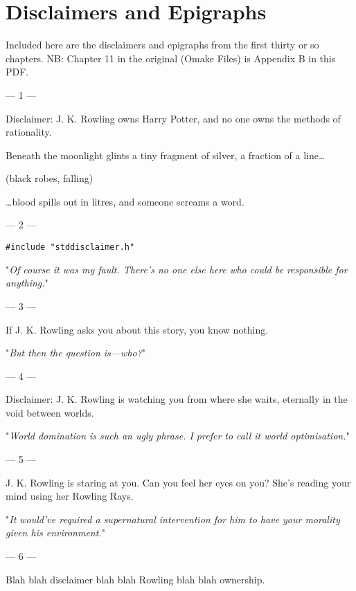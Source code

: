 \chapter{Disclaimers and Epigraphs}

Included here are the disclaimers and epigraphs from the first thirty or so
chapters. NB: Chapter 11 in the original (Omake Files) is Appendix B in this PDF.

\sbreak
{ %
\setlength{\parindent}{0pt}
\setlength{\parskip}{1em}

\filbreak
--- 1 ---

Disclaimer: J. K. Rowling owns Harry Potter, and no one owns the methods of rationality.

\begin{em}
Beneath the moonlight glints a tiny fragment of silver, a fraction of a line{\ldots}

(black robes, falling)

{\ldots}blood spills out in litres, and someone screams a word.
\end{em}

\filbreak
--- 2 ---

\texttt{\#include "stddisclaimer.h"}

"\emph{Of course it was my fault. There's no one else here who could be 
responsible for anything.}"

\filbreak
--- 3 ---

If J. K. Rowling asks you about this story, you know nothing.

"\emph{But then the question is---who?}"

\filbreak
--- 4 ---

Disclaimer: J. K.
Rowling is watching you from where she waits, eternally in the void between
worlds.

"\emph{World domination is such an ugly phrase. I prefer to call it world
optimisation.}"

\filbreak
--- 5 ---

J. K. Rowling is
staring at you. Can you feel her eyes on you? She's reading your mind using her
Rowling Rays.

"\emph{It would've required a \emph{supernatural intervention} for him to have
\emph{your} morality given \emph{his} environment.}"

\filbreak
--- 6 ---

Blah blah
disclaimer blah blah Rowling blah blah ownership.

}
